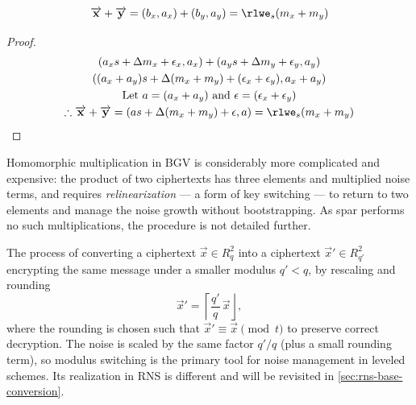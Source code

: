 \begin{definition}
    \begin{equation}
        \vec{x} + \vec{y} = (b_x, a_x) + (b_y, a_y) = \rlwe_s(m_x + m_y)
    \end{equation}
    \begin{proof}
        \begin{gather*}
            (a_x s + \Delta m_x + \epsilon_x, a_x) + (a_y s + \Delta m_y + \epsilon_y, a_y) \\
            ((a_x +a_y )s + \Delta (m_x+m_y) + (\epsilon_x + \epsilon_y), a_x + a_y) \\
            \text{Let } a = (a_x + a_y) \text{ and } \epsilon = (\epsilon_x + \epsilon_y)\\
            \therefore \vec{x} + \vec{y} = (as + \Delta(m_x + m_y) + \epsilon, a) = \rlwe_s(m_x + m_y)
        \end{gather*}
    \end{proof}
\end{definition}

Homomorphic multiplication in BGV is considerably more complicated and expensive: the product of two ciphertexts has three elements and multiplied noise terms, and requires \textit{relinearization} --- a form of key switching --- to return to two elements and manage the noise growth without bootstrapping. As \gls{spar} performs no such multiplications, the procedure is not detailed further.

\begin{definition}
    The process of converting a ciphertext $\vec{x}\in R_q^2$ into a ciphertext $\vec{x}'\in R_{q'}^2$ encrypting the same message under a smaller modulus $q' < q$, by rescaling and rounding
    \begin{equation}
        \vec{x}' = \left\lceil \frac{q'}{q}\, \vec{x} \right\rfloor,
    \end{equation}
    where the rounding is chosen such that $\vec{x}' \equiv \vec{x} \pmod{t}$ to preserve correct decryption. The noise is scaled by the same factor $q'/q$ (plus a small rounding term), so modulus switching is the primary tool for noise management in leveled schemes. Its realization in RNS is different and will be revisited in \autoref{sec:rns-base-conversion}.
\end{definition}

